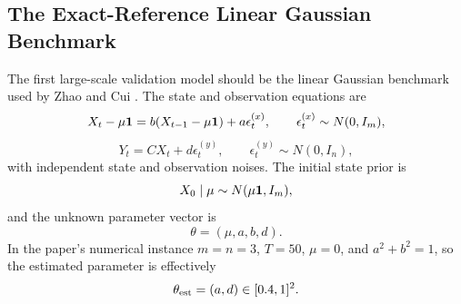 \documentclass[11pt]{article}
\numberwithin{equation}{section}
\begin{document}
\subsection{The Exact-Reference Linear Gaussian Benchmark}

The first large-scale validation model should be the linear Gaussian benchmark
used by Zhao and Cui \cite{zhao2024ttsequential}.  The state and observation
equations are
\begin{equation}
    X_t-\mu{\bf 1}
    =
    b(X_{t-1}-\mu{\bf 1})+a\epsilon_t^{(x)},
    \qquad
    \epsilon_t^{(x)}\sim N(0,I_m),
    \label{eq:p27-lg1}
\end{equation}
\begin{equation}
    Y_t
    =
    C X_t+d\epsilon_t^{(y)},
    \qquad
    \epsilon_t^{(y)}\sim N(0,I_n),
    \label{eq:p27-lg2}
\end{equation}
with independent state and observation noises.  The initial state prior is
\begin{equation}
    X_0\mid\mu\sim N(\mu{\bf 1},I_m),
    \label{eq:p27-lg3}
\end{equation}
and the unknown parameter vector is
\begin{equation}
    \theta=(\mu,a,b,d).
    \label{eq:p27-lg4}
\end{equation}
In the paper's numerical instance \(m=n=3\), \(T=50\), \(\mu=0\), and
\(a^2+b^2=1\), so the estimated parameter is effectively
\begin{equation}
    \theta_{\rm est}=(a,d)\in[0.4,1]^2.
    \label{eq:p27-lg5}
\end{equation}
\end{document}
